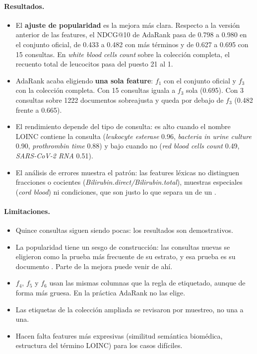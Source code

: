 \documentclass[11pt,a4paper]{article}
\begin{document}
\paragraph{Resultados.}
\begin{itemize}[nosep]
\item El \textbf{ajuste de popularidad} es la mejora más clara. Respecto a la versión anterior de las features, el NDCG@10 de
  AdaRank pasa de 0.798 a 0.980 en el conjunto oficial, de 0.433 a 0.482 con más términos y de 0.627 a 0.695 con 15 consultas.
  En \emph{white blood cells count} sobre la colección completa, el recuento total de leucocitos pasa del puesto 21 al 1.
\item AdaRank acaba eligiendo \textbf{una sola feature}: $f_1$ con el conjunto oficial y $f_3$ con la colección completa. Con 15
  consultas iguala a $f_3$ sola (0.695). Con 3 consultas sobre 1222 documentos sobreajusta y queda por debajo de $f_3$ (0.482 frente a 0.665).
\item El rendimiento depende del tipo de consulta: es alto cuando el nombre LOINC contiene la consulta (\emph{leukocyte esterase} 0.96,
  \emph{bacteria in urine culture} 0.90, \emph{prothrombin time} 0.88) y bajo cuando no (\emph{red blood cells count} 0.49,
  \emph{SARS-CoV-2 RNA} 0.51).
\item El análisis de errores muestra el patrón: las features léxicas no distinguen fracciones o cocientes (\emph{Bilirubin.direct/Bilirubin.total}),
  muestras especiales (\emph{cord blood}) ni condiciones, que son justo lo que separa un  de un .
\end{itemize}

\paragraph{Limitaciones.}
\begin{itemize}[nosep]
\item Quince consultas siguen siendo pocas: los resultados son demostrativos.
\item La popularidad tiene un sesgo de construcción: las consultas nuevas se eligieron como la prueba más frecuente de su estrato,
  y esa prueba es su documento . Parte de la mejora puede venir de ahí.
\item $f_4$, $f_5$ y $f_6$ usan las mismas columnas que la regla de etiquetado, aunque de forma más gruesa. En la práctica AdaRank no las elige.
\item Las etiquetas de la colección ampliada se revisaron por muestreo, no una a una.
\item Hacen falta features más expresivas (similitud semántica biomédica, estructura del término LOINC) para los casos difíciles.
\end{itemize}
\end{document}
